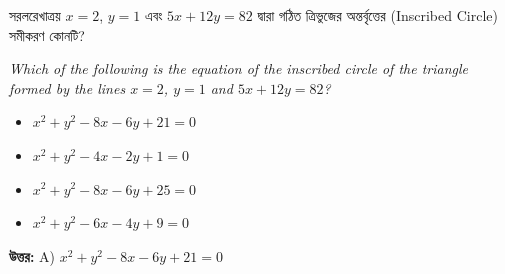 \documentclass[12pt, a4paper]{article}
\begin{document}
\vspace{2em}

\begin{tcolorbox}[questionbox={প্রশ্ন (Question) 27}]
    \noindent
    সরলরেখাত্রয় $x = 2$, $y = 1$ এবং $5x + 12y = 82$ দ্বারা গঠিত ত্রিভুজের অন্তর্বৃত্তের (Inscribed Circle) সমীকরণ কোনটি?
    
    \vspace{0.8em}
    \begin{english}
    \noindent\textit{\color{darkgray}
    Which of the following is the equation of the inscribed circle of the triangle formed by the lines $x = 2$, $y = 1$ and $5x + 12y = 82$?
    }
    \end{english}
\end{tcolorbox}

\begin{itemize}[label={}, leftmargin=1cm, itemsep=0.5em]
    \item[\textbf{A)}] $x^2 + y^2 - 8x - 6y + 21 = 0$
    \item[\textbf{B)}] $x^2 + y^2 - 4x - 2y + 1 = 0$
    \item[\textbf{C)}] $x^2 + y^2 - 8x - 6y + 25 = 0$
    \item[\textbf{D)}] $x^2 + y^2 - 6x - 4y + 9 = 0$
\end{itemize}

\vspace{0.5em}
\begin{tcolorbox}[answerbox]
    \textbf{\color{success} উত্তর:} A) $x^2 + y^2 - 8x - 6y + 21 = 0$
\end{tcolorbox}
\vspace{1em}
\end{document}
